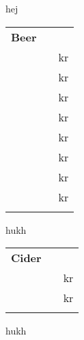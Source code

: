 \documentclass[12pt, twoside]{article}
\newcommand*\fontstyle[1]{%
  {\fontsize{15}{20}\sffamily{#1}}
}
\newcommand*\pricestyle[1]{%
  {\fontsize{14}{20}\normalfont#1}
}
\newcommand*\ColText[1]{\textcolor{Goldenrod3}{#1}}
\newenvironment{menuSection}[1]
  {
    \begin{longtable}{p{0cm}p{12cm}p{1.5cm}}
    {\fontsize{30}{34}\bf\selectfont\ColText{#1} }
    \\ \nopagebreak
  }
{\end{longtable}
hukh \pagebreak[3] \\ }
\newcommand*\beer[2]{
& \fontstyle{#1} & \pricestyle{#2 kr} \nopagebreak \\ [1.7ex]\nopagebreak[4]%
}
\begin{document}
hej
\newpage


%


\begin{menuSection}{Beer}

\beer{Bavaria}{15}
\beer{Bavaria Wit 0.0\% alcohol free}{15}
\beer{Budvar Premium}{20}
\beer{Budvar Dark 50 cl}{25}
\beer{Lindemans Apple 25 cl}{20}
\beer{Black Isle}{30}
\beer{Weinstephaner}{30}
\beer{Aecht Schlenkerla Rauchbier 50 cl}{35}
\end{menuSection}



\begin{menuSection}{Cider}
\beer{Angry Orchard}{25}
\beer{Green Goblin}{35}
\end{menuSection}


\end{document}
